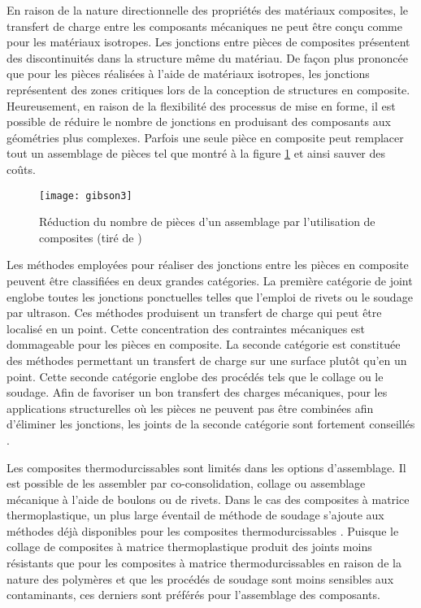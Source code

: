 En raison de la nature directionnelle des propriétés des matériaux composites, le transfert de charge entre les composants mécaniques ne peut être conçu comme pour les matériaux isotropes. 
Les jonctions entre pièces de composites présentent des discontinuités dans la structure même du matériau. 
De façon plus prononcée que pour les pièces réalisées à l'aide de matériaux isotropes, les jonctions représentent des zones critiques lors de la conception de structures en composite. 
Heureusement, en raison de la flexibilité des processus de mise en forme, il est possible de réduire le nombre de jonctions en produisant des composants aux géométries plus complexes. 
Parfois une seule pièce en composite peut remplacer tout un assemblage de pièces tel que montré à la figure \ref{gibson3} et ainsi sauver des coûts. 

\begin{figure}
	\centering
	\texttt{[image: gibson3]}
	\centering
	\caption{Réduction du nombre de pièces d'un assemblage par l'utilisation de composites (tiré de \cite{Gibson2011})}
	\label{gibson3}
\end{figure}

Les méthodes employées pour réaliser des jonctions entre les pièces en composite peuvent être classifiées en deux grandes catégories. La première catégorie de joint englobe toutes les jonctions ponctuelles telles que l'emploi de rivets ou le soudage par ultrason. Ces méthodes produisent un transfert de charge qui peut être localisé en un point. 
Cette concentration des contraintes mécaniques est dommageable pour les pièces en composite. 
La seconde catégorie est constituée des méthodes permettant un transfert de charge sur une surface plutôt qu'en un point. 
Cette seconde catégorie englobe des procédés tels que le collage ou le soudage. 
Afin de favoriser un bon transfert des charges mécaniques, pour les applications structurelles où les pièces ne peuvent pas être combinées afin d'éliminer les jonctions, les joints de la seconde catégorie sont fortement conseillés \cite{campbell2003}. 

Les composites thermodurcissables sont limités dans les options d'assemblage. 
Il est possible de les assembler par co-consolidation, collage ou assemblage mécanique à l'aide de boulons ou de rivets.
Dans le cas des composites à matrice thermoplastique, un plus large éventail de méthode de soudage s'ajoute aux méthodes déjà disponibles pour les composites thermodurcissables \cite{campbell2003}. 
Puisque le collage de composites à matrice thermoplastique produit des joints moins résistants que pour les composites à matrice thermodurcissables en raison de la nature des polymères \cite{campbell2003} et que les procédés de soudage sont moins sensibles aux contaminants, ces derniers sont préférés pour l'assemblage des composants. 

